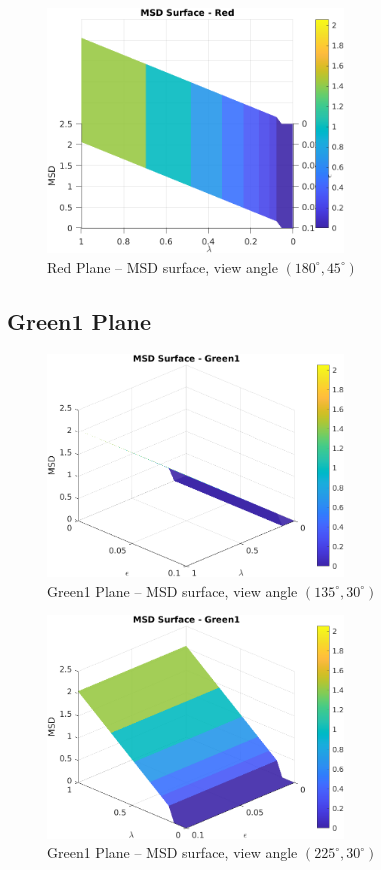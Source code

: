 \documentclass[11pt]{article}
\begin{document}
\begin{figure}[h!]
\centering
\includegraphics[width=0.7\textwidth]{../utils/results/msd_surfaces/msd_surface_red_angle_180_45.png}
\caption{Red Plane – MSD surface, view angle $(180^\circ, 45^\circ)$}
\end{figure}
\clearpage

\subsection*{Green1 Plane}
\begin{figure}[h!]
\centering
\includegraphics[width=0.7\textwidth]{../utils/results/msd_surfaces/msd_surface_green1_angle_135_30.png}
\caption{Green1 Plane – MSD surface, view angle $(135^\circ, 30^\circ)$}
\end{figure}
\clearpage

\begin{figure}[h!]
\centering
\includegraphics[width=0.7\textwidth]{../utils/results/msd_surfaces/msd_surface_green1_angle_225_30.png}
\caption{Green1 Plane – MSD surface, view angle $(225^\circ, 30^\circ)$}
\end{figure}
\clearpage
\end{document}
